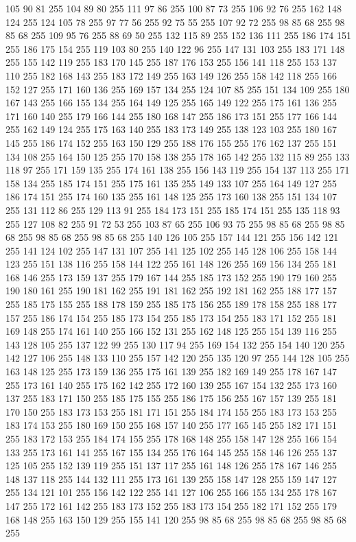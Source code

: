 105 90 81 255 104 89 80 255 111 97 86 255 100 87 73 255 106 92 76 255 162 148 124 255 124 105 78 255 97 77 56 255 92 75 55 255 107 92 72 255 98 85 68 255 98 85 68 255 109 95 76 255 88 69 50 255 132 115 89 255 152 136 111 255 186 174 151 255 186 175 154 255 119 103 80 255 140 122 96 255 147 131 103 255 183 171 148 255 155 142 119 255 183 170 145 255 187 176 153 255 156 141 118 255 153 137 110 255 182 168 143 255 183 172 149 255 163 149 126 255 158 142 118 255 166 152 127 255 171 160 136 255 169 157 134 255 124 107 85 255 151 134 109 255 180 167 143 255 166 155 134 255 164 149 125 255 165 149 122 255 175 161 136 255 171 160 140 255 179 166 144 255 180 168 147 255 186 173 151 255 177 166 144 255 162 149 124 255 175 163 140 255 183 173 149 255 138 123 103 255 180 167 145 255 186 174 152 255 163 150 129 255 188 176 155 255 176 162 137 255 151 134 108 255 164 150 125 255 170 158 138 255 178 165 142 255 132 115 89 255 133 118 97 255 171 159 135 255 174 161 138 255 156 143 119 255
154 137 113 255 171 158 134 255 185 174 151 255 175 161 135 255 149 133 107 255 164 149 127 255 186 174 151 255 174 160 135 255 161 148 125 255 173 160 138 255 151 134 107 255 131 112 86 255 129 113 91 255 184 173 151 255 185 174 151 255 135 118 93 255 127 108 82 255 91 72 53 255 103 87 65 255 106 93 75 255 98 85 68 255 98 85 68 255 98 85 68 255 98 85 68 255 140 126 105 255 157 144 121 255 156 142 121 255 141 124 102 255 147 131 107 255 141 125 102 255 145 128 106 255 158 144 123 255 151 138 116 255 158 144 122 255 161 148 126 255 169 156 134 255 181 168 146 255 173 159 137 255 179 167 144 255 185 173 152 255 190 179 160 255 190 180 161 255 190 181 162 255 191 181 162 255 192 181 162 255 188 177 157 255 185 175 155 255 188 178 159 255 185 175 156 255 189 178 158 255 188 177 157 255 186 174 154 255 185 173 154 255 185 173 154 255 183 171 152 255 181 169 148 255 174 161 140 255 166 152 131 255 162 148 125 255 154 139 116 255 143 128 105 255 137 122 99 255 130 117 94 255 169 154 132 255
154 140 120 255 142 127 106 255 148 133 110 255 157 142 120 255 135 120 97 255 144 128 105 255 163 148 125 255 173 159 136 255 175 161 139 255 182 169 149 255 178 167 147 255 173 161 140 255 175 162 142 255 172 160 139 255 167 154 132 255 173 160 137 255 183 171 150 255 185 175 155 255 186 175 156 255 167 157 139 255 181 170 150 255 183 173 153 255 181 171 151 255 184 174 155 255 183 173 153 255 183 174 153 255 180 169 150 255 168 157 140 255 177 165 145 255 182 171 151 255 183 172 153 255 184 174 155 255 178 168 148 255 158 147 128 255 166 154 133 255 173 161 141 255 167 155 134 255 176 164 145 255 158 146 126 255 137 125 105 255 152 139 119 255 151 137 117 255 161 148 126 255 178 167 146 255 148 137 118 255 144 132 111 255 173 161 139 255 158 147 128 255 159 147 127 255 134 121 101 255 156 142 122 255 141 127 106 255 166 155 134 255 178 167 147 255 172 161 142 255 183 173 152 255 183 173 154 255 182 171 152 255 179 168 148 255 163 150 129 255 155 141 120 255 98 85 68 255 98 85 68 255 98 85 68 255
